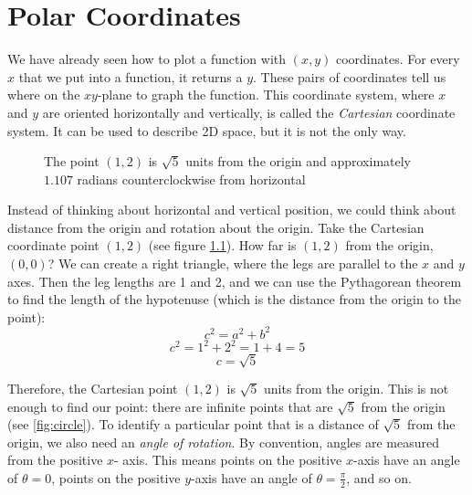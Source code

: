 \chapter{Polar Coordinates}

We have already seen how to plot a function with $(x,y)$ coordinates. For 
every $x$ that we put into a function, it returns a $y$. These pairs of 
coordinates tell us where on the $xy$-plane to graph the function. This 
coordinate system, where $x$ and $y$ are oriented horizontally and vertically, 
is called the \textit{Cartesian} coordinate system. It can be used to describe 
2D space, but it is not the only way. 

\begin{figure}[htbp]
\centering
    \caption{The point $(1, 2)$ is $\sqrt{5}$ units from the origin and 
    approximately $1.107$ radians counterclockwise from horizontal}
    \label{fig:cartesian}
    \end{figure}

Instead of thinking about horizontal and vertical position, we could think 
about distance from the origin and rotation about the origin. Take the 
Cartesian coordinate point $(1, 2)$ (see figure \ref{fig:cartesian}). How far is 
$(1,2)$ from the origin, $(0,0)$? We can create a right triangle, where the 
legs are parallel to the $x$ and $y$ axes. Then the leg lengths are 1 and 2, 
and we can use the Pythagorean theorem to find the length of the hypotenuse 
(which is the distance from the origin to the point):
$$c^2 = a^2 + b^2$$
$$c^2 = 1^2 + 2^2 = 1 + 4 = 5$$
$$c = \sqrt{5}$$

Therefore, the Cartesian point $(1, 2)$ is $\sqrt{5}$ units from the origin. 
This is not enough to find our point: there are infinite points that are 
$\sqrt{5}$ from the origin (see \ref{fig:circle}). To identify a particular point 
that is a distance of $\sqrt{5}$ from the origin, we also need an \textit{
angle of rotation}. By convention, angles are measured from the positive $x$-
axis. This means points on the positive $x$-axis have an angle of $\theta = 
0$, points on the positive $y$-axis have an angle of $\theta = \frac{\pi}{2}$, 
and so on. 

